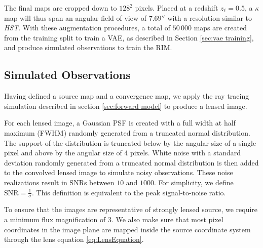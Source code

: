The final maps are cropped down to $128^2$ pixels.
Placed at a redshift $z_\ell=0.5$, a $\kappa$ map will thus span an angular field of view of $7.69''$ with 
a resolution similar to \textit{HST}. 
With these augmentation procedures, a total of $50\,000$ maps are created from the training split
to train a VAE, as described in Section \ref{sec:vae training}, and produce simulated observations to train the RIM. 

\subsection{Simulated Observations}\label{sec:simulated observation}
Having defined a source map and a convergence map, we apply the ray tracing simulation 
described in section \ref{sec:forward model} to produce a lensed image. 

For each lensed image, a Gaussian PSF is 
created with a full width at half maximum (FWHM) 
randomly generated from a truncated normal distribution.
The support of the distribution is truncated below by the 
angular size of a single pixel and above by the angular size of 4 pixels. 
White noise with a standard deviation randomly generated from a truncated normal distribution 
is then added to the convolved lensed image to simulate noisy observations. These noise realizations result in SNRs between 
$10$ and $1000$. For simplicity, we define $\mathrm{SNR} = \frac{1}{\sigma}$. 
This definition is equivalent to the peak signal-to-noise ratio. 

To ensure that the images are representative of strongly lensed source, we require a minimum flux magnification of 3. We
also make sure that most pixel coordinates in the image plane are mapped inside the 
source coordinate system through the lens equation \eqref{eq:LensEquation}. 

